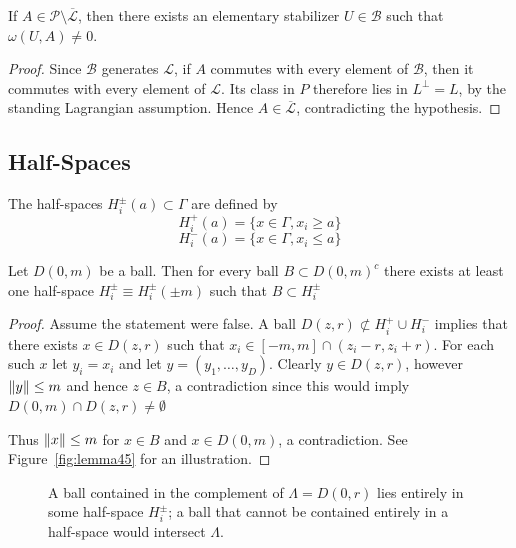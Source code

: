 \documentclass[11pt]{amsart}
\begin{document}
\begin{lem}
    If $A\in\mathcal P\setminus\overline{\mathcal L}$, then there exists an elementary stabilizer $U\in\mathcal B$ such that $\omega(U,A)\neq0$.
    \begin{proof}
        Since $\mathcal B$ generates $\mathcal L$, if $A$ commutes with every element of $\mathcal B$, then it commutes with every element of $\mathcal L$. Its class in $P$ therefore lies in $L^\perp=L$, by the standing Lagrangian assumption. Hence $A\in\overline{\mathcal L}$, contradicting the hypothesis.
    \end{proof}
\end{lem}
\subsection{Half-Spaces}
\begin{defn}
    The half-spaces $H_i^{\pm}(a)\subset\Gamma$ are defined by
    \[
        H_i^+(a)=\{x\in \Gamma, x_i \geq a \}
    \]
    \[
        H_i^-(a)=\{x\in \Gamma, x_i \leq a \}
    \]
\end{defn}
\begin{lem}\label{lem: Balls in complements lie in half spaces}
    Let $D(0,m)$ be a ball. Then for every ball $B\subset D(0,m)^c $ there exists at least one half-space $H_i^\pm\equiv H_i^\pm(\pm m)$ such that $B\subset H_i^\pm$
    \begin{proof}
        Assume the statement were false. A ball $D(z,r)\not\subset H_i^+\cup H_i^-$ implies that there exists $x\in D(z,r)$ such that $x_i \in \left[-m,m\right]\cap (z_i-r,z_i+r)$. For each such $x$ let $y_i=x_i$ and let $y=(y_1,\ldots, y_D)$. Clearly $y\in D(z,r)$, however $\left\lVert y\right\rVert\leq m$ and hence $z\in B$, a contradiction since this would imply $D(0,m)\cap D(z,r)\neq \emptyset$
        
        Thus $\left\lVert x\right\rVert\leq m$ for $x\in B$ and $x\in D(0,m)$, a contradiction. See Figure~\ref{fig:lemma45} for an illustration.
    \end{proof}
    \begin{figure}[ht]
      \centering
      \resizebox{\textwidth}{!}{%
      }
      \caption{A ball contained in the complement of $\Lambda=D(0,r)$
      lies entirely in some half-space $H_i^{\pm}$; a ball that
      cannot be contained entirely in a half-space would intersect $\Lambda$.}
      \label{fig:ball-in-complement-halfspace}
    \end{figure}
\end{lem}
\end{document}
